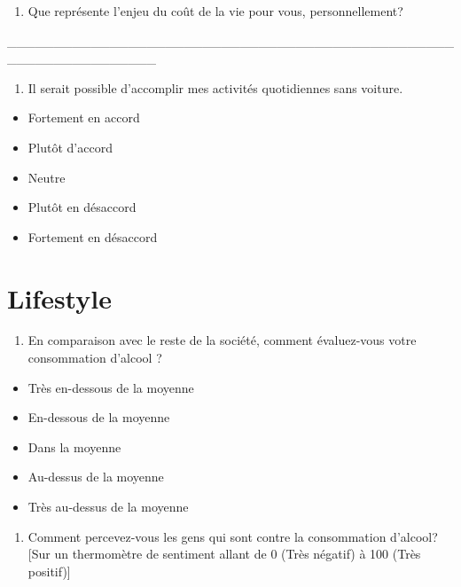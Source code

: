 \documentclass[
  letterpaper,
  DIV=11,
  numbers=noendperiod]{scrreprt}
\providecommand{\tightlist}{%
  \setlength{\itemsep}{0pt}\setlength{\parskip}{0pt}}\usepackage{longtable,booktabs,array}
\begin{document}
\begin{enumerate}
\def\labelenumi{\arabic{enumi}.}
\setcounter{enumi}{49}
\tightlist
\item
  Que représente l'enjeu du coût de la vie pour vous, personnellement?
\end{enumerate}

\_\_\_\_\_\_\_\_\_\_\_\_\_\_\_\_\_\_\_\_\_\_\_\_\_\_\_\_\_\_\_\_\_\_\_\_\_\_\_\_\_\_\_\_\_\_\_\_\_\_\_\_\_\_\_\_\_\_\_\_\_\_\_\_

\begin{enumerate}
\def\labelenumi{\arabic{enumi}.}
\setcounter{enumi}{50}
\tightlist
\item
  Il serait possible d'accomplir mes activités quotidiennes sans
  voiture.
\end{enumerate}

\begin{itemize}
\tightlist
\item
  Fortement en accord
\item
  Plutôt d'accord
\item
  Neutre
\item
  Plutôt en désaccord
\item
  Fortement en désaccord
\end{itemize}

\hypertarget{lifestyle}{%
\section{Lifestyle}\label{lifestyle}}

\begin{enumerate}
\def\labelenumi{\arabic{enumi}.}
\setcounter{enumi}{51}
\tightlist
\item
  En comparaison avec le reste de la société, comment évaluez-vous votre
  consommation d'alcool ?
\end{enumerate}

\begin{itemize}
\tightlist
\item
  Très en-dessous de la moyenne
\item
  En-dessous de la moyenne
\item
  Dans la moyenne
\item
  Au-dessus de la moyenne
\item
  Très au-dessus de la moyenne
\end{itemize}

\begin{enumerate}
\def\labelenumi{\arabic{enumi}.}
\setcounter{enumi}{52}
\tightlist
\item
  Comment percevez-vous les gens qui sont contre la consommation
  d'alcool? {[}Sur un thermomètre de sentiment allant de 0 (Très
  négatif) à 100 (Très positif){]}
\end{enumerate}
\end{document}
